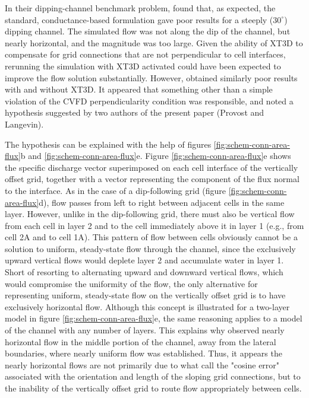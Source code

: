\documentclass{article}
\begin{document}
In their dipping-channel benchmark problem, \cite{bardot2022} found that, as expected, the standard, conductance-based formulation gave poor results for a steeply ($30^{\circ}$) dipping channel. The simulated flow was not along the dip of the channel, but nearly horizontal, and the magnitude was too large. Given the ability of XT3D to compensate for grid connections that are not perpendicular to cell interfaces, rerunning the simulation with XT3D activated could have been expected to improve the flow solution substantially. However, \cite{bardot2022} obtained similarly poor results with and without XT3D. It appeared that something other than a simple violation of the CVFD perpendicularity condition was responsible, and \cite{bardot2022} noted a hypothesis suggested by two authors of the present paper (Provost and Langevin).

The hypothesis can be explained with the help of figures \ref{fig:schem-conn-area-flux}b and \ref{fig:schem-conn-area-flux}e. Figure \ref{fig:schem-conn-area-flux}e shows the specific discharge vector superimposed on each cell interface of the vertically offset grid, together with a vector representing the component of the flux normal to the interface. As in the case of a dip-following grid (figure \ref{fig:schem-conn-area-flux}d), flow passes from left to right between adjacent cells in the same layer. However, unlike in the dip-following grid, there must also be vertical flow from each cell in layer 2 and to the cell immediately above it in layer 1 (e.g., from cell 2A and to cell 1A). This pattern of flow between cells obviously cannot be a solution to uniform, steady-state flow through the channel, since the exclusively upward vertical flows would deplete layer 2 and accumulate water in layer 1. Short of resorting to alternating upward and downward vertical flows, which would compromise the uniformity of the flow, the only alternative for representing uniform, steady-state flow on the vertically offset grid is to have exclusively horizontal flow. Although this concept is illustrated for a two-layer model in figure \ref{fig:schem-conn-area-flux}e, the same reasoning applies to a model of the channel with any number of layers. This explains why \cite{bardot2022} observed nearly horizontal flow in the middle portion of the channel, away from the lateral boundaries, where nearly uniform flow was established. Thus, it appears the nearly horizontal flows are not primarily due to what \cite{bardot2022} call the "cosine error" associated with the orientation and length of the sloping grid connections, but to the inability of the vertically offset grid to route flow appropriately between cells.
\end{document}
